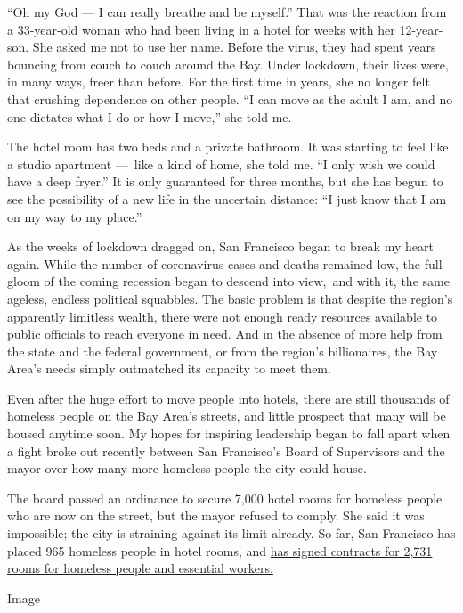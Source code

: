 ``Oh my God --- I can really breathe and be myself.'' That was the
reaction from a 33-year-old woman who had been living in a hotel for
weeks with her 12-year-son. She asked me not to use her name. Before the
virus, they had spent years bouncing from couch to couch around the Bay.
Under lockdown, their lives were, in many ways, freer than before. For
the first time in years, she no longer felt that crushing dependence on
other people. ``I can move as the adult I am, and no one dictates what I
do or how I move,'' she told me.

The hotel room has two beds and a private bathroom. It was starting to
feel like a studio apartment ---~like a kind of home, she told me. ``I
only wish we could have a deep fryer.'' It is only guaranteed for three
months, but she has begun to see the possibility of a new life in the
uncertain distance: ``I just know that I am on my way to my place.''

As the weeks of lockdown dragged on, San Francisco began to break my
heart again. While the number of coronavirus cases and deaths remained
low, the full gloom of the coming recession began to descend into
view,~and with it, the same ageless, endless political squabbles. The
basic problem is that despite the region's apparently limitless wealth,
there were not enough ready resources available to public officials to
reach everyone in need. And in the absence of more help from the state
and the federal government, or from the region's billionaires, the Bay
Area's needs simply outmatched its capacity to meet them.

Even after the huge effort to move people into hotels, there are still
thousands of homeless people on the Bay Area's streets, and little
prospect that many will be housed anytime soon. My hopes for inspiring
leadership began to fall apart when a fight broke out recently between
San Francisco's Board of Supervisors and the mayor over how many more
homeless people the city could house.

The board passed an ordinance to secure 7,000 hotel rooms for homeless
people who are now on the street, but the mayor refused to comply. She
said it was impossible; the city is straining against its limit already.
So far, San Francisco has placed 965 homeless people in hotel rooms, and
\href{https://www.wsj.com/articles/san-francisco-leaders-clash-over-hotel-rooms-for-homeless-population-11588696567}{has
signed contracts for 2,731 rooms for homeless people and essential
workers.}

Image

